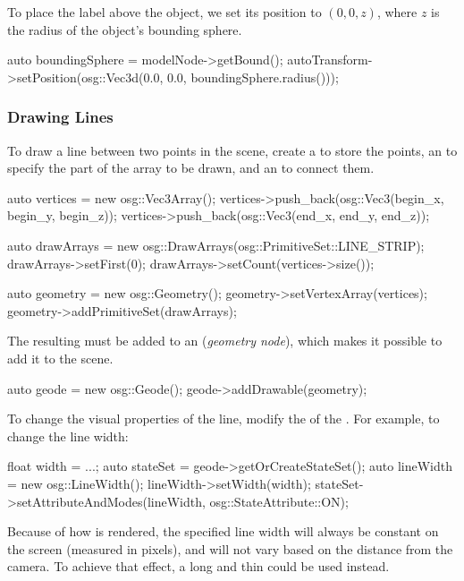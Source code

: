 To place the label above the object, we set its position to $(0,0,z)$, where $z$
is the radius of the object's bounding sphere.

\begin{cpp}
auto boundingSphere = modelNode->getBound();
autoTransform->setPosition(osg::Vec3d(0.0, 0.0, boundingSphere.radius()));
\end{cpp}



\subsubsection{Drawing Lines}
\label{sec:graphics:osg-drawing-lines}

To draw a line between two points in the scene, create a 
to store the points, an  to specify the part of the
array to be drawn, and an  to connect them.

\begin{cpp}
auto vertices = new osg::Vec3Array();
vertices->push_back(osg::Vec3(begin_x, begin_y, begin_z));
vertices->push_back(osg::Vec3(end_x, end_y, end_z));

auto drawArrays = new osg::DrawArrays(osg::PrimitiveSet::LINE_STRIP);
drawArrays->setFirst(0);
drawArrays->setCount(vertices->size());

auto geometry = new osg::Geometry();
geometry->setVertexArray(vertices);
geometry->addPrimitiveSet(drawArrays);
\end{cpp}

The resulting  must be added to an 
(\textit{geometry node}), which makes it possible to add it to the scene.

\begin{cpp}
auto geode = new osg::Geode();
geode->addDrawable(geometry);
\end{cpp}

To change the visual properties of the line, modify the 
of the . For example, to change the line width:

\begin{cpp}
float width = ...;
auto stateSet = geode->getOrCreateStateSet();
auto lineWidth = new osg::LineWidth();
lineWidth->setWidth(width);
stateSet->setAttributeAndModes(lineWidth, osg::StateAttribute::ON);
\end{cpp}

Because of how  is rendered, the specified line width
will always be constant on the screen (measured in pixels), and will not vary
based on the distance from the camera. To achieve that effect, a long and thin
 could be used instead.


